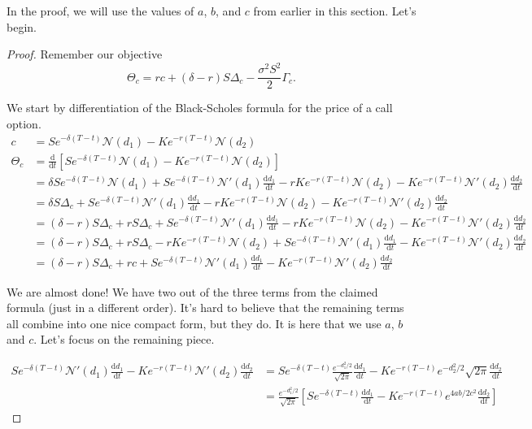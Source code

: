 \documentclass{ximera}
\begin{document}
In the proof, we will use the values of $a$, $b$, and $c$ from earlier in this section. Let's begin.

\begin{proof}
Remember our objective
	\begin{equation*}
	\Theta_c=rc+(\delta-r)S\Delta_c-\frac{\sigma^2S^2}{2}\Gamma_c.
	\end{equation*}

We start by differentiation of the Black-Scholes formula for the price of a call option.
	\begin{align*}
	c 		&=Se^{-\delta(T-t)}\mathcal{N}(d_1)-Ke^{-r(T-t)}\mathcal{N}(d_2)\\
	\Theta_c 	&=\frac{\mathrm{d}}{\mathrm{d}t}\left[Se^{-\delta(T-t)}\mathcal{N}(d_1)-Ke^{-r(T-t)}\mathcal{N}(d_2)\right]\\
			&=\delta Se^{-\delta(T-t)}\mathcal{N}(d_1)+Se^{-\delta(T-t)}\mathcal{N}'(d_1)\frac{\mathrm{d}d_1}{\mathrm{d}t}-rKe^{-r(T-t)}\mathcal{N}(d_2)-Ke^{-r(T-t)}\mathcal{N}'(d_2)\frac{\mathrm{d}d_2}{\mathrm{d}t}\\
			&=\delta S\Delta_c+Se^{-\delta(T-t)}\mathcal{N}'(d_1)\frac{\mathrm{d}d_1}{\mathrm{d}t}-rKe^{-r(T-t)}\mathcal{N}(d_2)-Ke^{-r(T-t)}\mathcal{N}'(d_2)\frac{\mathrm{d}d_2}{\mathrm{d}t}\\
			&=(\delta-r) S\Delta_c+rS\Delta_c+Se^{-\delta(T-t)}\mathcal{N}'(d_1)\frac{\mathrm{d}d_1}{\mathrm{d}t}-rKe^{-r(T-t)}\mathcal{N}(d_2)-Ke^{-r(T-t)}\mathcal{N}'(d_2)\frac{\mathrm{d}d_2}{\mathrm{d}t}\\
			&=(\delta-r) S\Delta_c+rS\Delta_c-rKe^{-r(T-t)}\mathcal{N}(d_2)+Se^{-\delta(T-t)}\mathcal{N}'(d_1)\frac{\mathrm{d}d_1}{\mathrm{d}t}-Ke^{-r(T-t)}\mathcal{N}'(d_2)\frac{\mathrm{d}d_2}{\mathrm{d}t}\\
			&=(\delta-r) S\Delta_c+rc+Se^{-\delta(T-t)}\mathcal{N}'(d_1)\frac{\mathrm{d}d_1}{\mathrm{d}t}-Ke^{-r(T-t)}\mathcal{N}'(d_2)\frac{\mathrm{d}d_2}{\mathrm{d}t}			
	\end{align*}

We are almost done! We have two out of the three terms from the claimed formula (just in a different order). It's hard to believe that the remaining terms all combine into one nice compact form, but they do. It is here that we use $a$, $b$ and $c$. Let's focus on the remaining piece.

	\begin{align}
	Se^{-\delta(T-t)}\mathcal{N}'(d_1)\frac{\mathrm{d}d_1}{\mathrm{d}t}-Ke^{-r(T-t)}\mathcal{N}'(d_2)\frac{\mathrm{d}d_2}{\mathrm{d}t} 	&=Se^{-\delta(T-t)}\frac{e^{-d_1^2/2}}{\sqrt{2\pi}}\frac{\mathrm{d}d_1}{\mathrm{d}t}-Ke^{-r(T-t)}e^{-d_2^2/2}{\sqrt{2\pi}}\frac{\mathrm{d}d_2}{\mathrm{d}t}\\
																							&=\frac{e^{-d_1^2/2}}{\sqrt{2\pi}}\left[Se^{-\delta(T-t)}\frac{\mathrm{d}d_1}{\mathrm{d}t}-Ke^{-r(T-t)}e^{4ab/2c^2}\frac{\mathrm{d}d_2}{\mathrm{d}t}\right]
	\end{align}


\end{proof}
\end{document}
